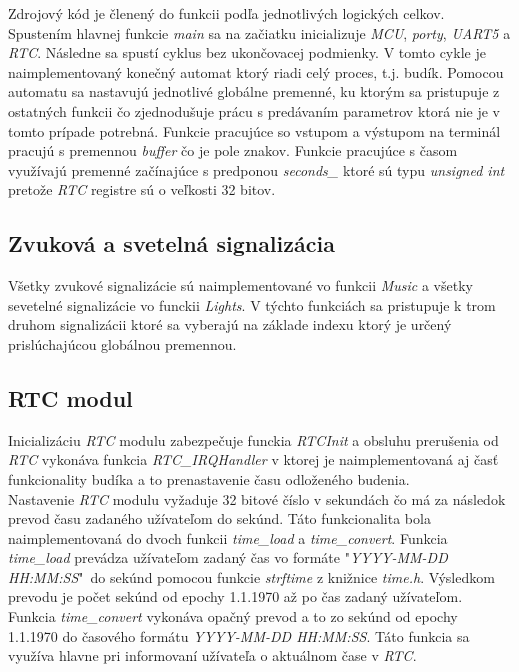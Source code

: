 \documentclass[11pt,a4paper]{article}
\begin{document}
    \indent Zdrojový kód je členený do funkcii podľa jednotlivých logických celkov. Spustením hlavnej funkcie \textit{main} sa na začiatku inicializuje \textit{MCU}, \textit{porty}, \textit{UART5} a \textit{RTC}. Následne sa spustí cyklus bez ukončovacej podmienky. V tomto cykle je naimplementovaný konečný automat ktorý riadi celý proces, t.j. budík. Pomocou automatu sa nastavujú jednotlivé globálne premenné, ku ktorým sa pristupuje z ostatných funkcii čo zjednodušuje prácu s predávaním parametrov ktorá nie je v tomto prípade potrebná. Funkcie pracujúce so vstupom a výstupom na terminál pracujú s premennou \textit{buffer} čo je pole znakov. Funkcie pracujúce s časom využívajú premenné začínajúce s predponou \textit{seconds\_} ktoré sú typu \textit{unsigned int} pretože \textit{RTC} registre sú o veľkosti 32 bitov.

    \subsection{Zvuková a svetelná signalizácia}

        \indent Všetky zvukové signalizácie sú naimplementované vo funkcii \textit{Music} a všetky sevetelné signalizácie vo funckii \textit{Lights}. V týchto funkciách sa pristupuje k trom druhom signalizácii ktoré sa vyberajú na základe indexu ktorý je určený prislúchajúcou globálnou premennou.

    \subsection{RTC modul}

        \indent Inicializáciu \textit{RTC} modulu zabezpečuje funckia \textit{RTCInit} a obsluhu prerušenia od \textit{RTC} vykonáva funkcia \textit{RTC\_IRQHandler} v ktorej je naimplementovaná aj časť funkcionality budíka a to prenastavenie času odloženého budenia.\\

        \indent Nastavenie \textit{RTC} modulu vyžaduje 32 bitové číslo v sekundách čo má za následok prevod času zadaného užívateľom do sekúnd. Táto funkcionalita bola naimplementovaná do dvoch funkcii \textit{time\_load} a \textit{time\_convert}. Funkcia \textit{time\_load} prevádza užívateľom zadaný čas vo formáte "\textit{YYYY-MM-DD HH:MM:SS}"\ do sekúnd pomocou funkcie \textit{strftime} z knižnice \textit{time.h}. Výsledkom prevodu je počet sekúnd od epochy 1.1.1970 až po čas zadaný užívateľom. Funkcia \textit{time\_convert} vykonáva opačný prevod a to zo sekúnd od epochy 1.1.1970 do časového formátu \textit{YYYY-MM-DD HH:MM:SS}. Táto funkcia sa využíva hlavne pri informovaní užívateľa o aktuálnom čase v \textit{RTC}.
  
\end{document}
